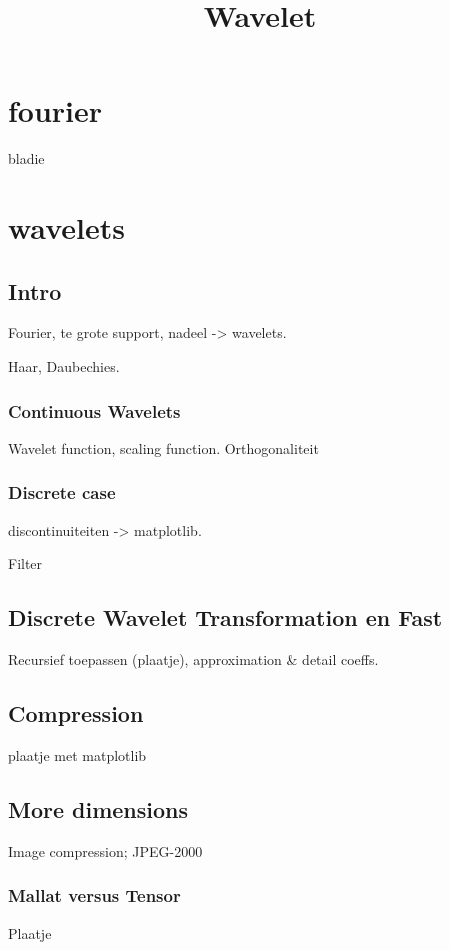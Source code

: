 \documentclass[11pt]{amsbook}
\theoremstyle{definition}
\begin{document}
\title{Wavelet}
\maketitle

\chapter{fourier}
bladie

\chapter{wavelets}

\section{Intro}
Fourier, te grote support, nadeel -> wavelets.

Haar, Daubechies.

\subsection{Continuous Wavelets}
Wavelet function, scaling function. Orthogonaliteit

\subsection{Discrete case}
discontinuiteiten -> matplotlib.

Filter

\section{Discrete Wavelet Transformation en Fast}
Recursief toepassen (plaatje), approximation & detail coeffs.

\section{Compression}
plaatje met matplotlib

\section{More dimensions}
Image compression; JPEG-2000
\subsection{Mallat versus Tensor}
Plaatje
\end{document}

